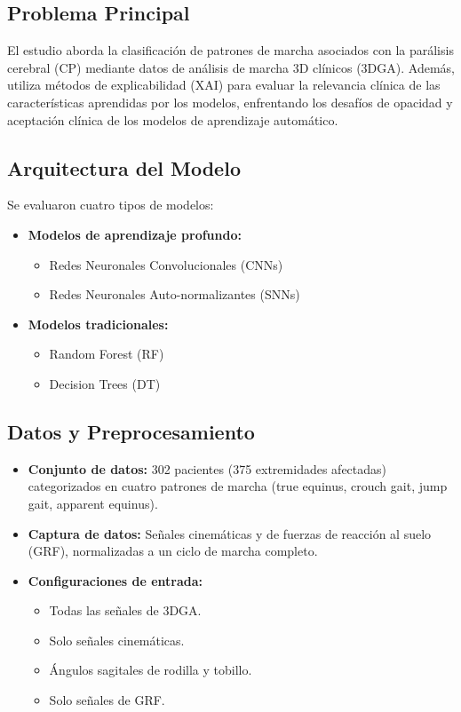 \documentclass{report}
\begin{document}
\subsection{Problema Principal}
El estudio aborda la clasificación de patrones de marcha asociados con la parálisis cerebral (CP) mediante datos de análisis de marcha 3D clínicos (3DGA). Además, utiliza métodos de explicabilidad (XAI) para evaluar la relevancia clínica de las características aprendidas por los modelos, enfrentando los desafíos de opacidad y aceptación clínica de los modelos de aprendizaje automático.

\subsection{Arquitectura del Modelo}
Se evaluaron cuatro tipos de modelos:
\begin{itemize}
    \item \textbf{Modelos de aprendizaje profundo:}
    \begin{itemize}
        \item Redes Neuronales Convolucionales (CNNs)
        \item Redes Neuronales Auto-normalizantes (SNNs)
    \end{itemize}
    \item \textbf{Modelos tradicionales:}
    \begin{itemize}
        \item Random Forest (RF)
        \item Decision Trees (DT)
    \end{itemize}
\end{itemize}

\subsection{Datos y Preprocesamiento}
\begin{itemize}
    \item \textbf{Conjunto de datos:} 302 pacientes (375 extremidades afectadas) categorizados en cuatro patrones de marcha (true equinus, crouch gait, jump gait, apparent equinus).
    \item \textbf{Captura de datos:} Señales cinemáticas y de fuerzas de reacción al suelo (GRF), normalizadas a un ciclo de marcha completo.
    \item \textbf{Configuraciones de entrada:}
    \begin{itemize}
        \item Todas las señales de 3DGA.
        \item Solo señales cinemáticas.
        \item Ángulos sagitales de rodilla y tobillo.
        \item Solo señales de GRF.
    \end{itemize}
\end{itemize}
\end{document}
